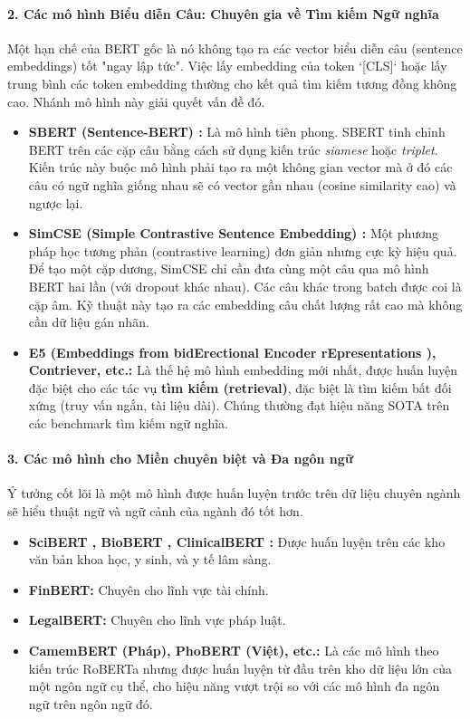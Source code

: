 \paragraph{2. Các mô hình Biểu diễn Câu: Chuyên gia về Tìm kiếm Ngữ nghĩa}
Một hạn chế của BERT gốc là nó không tạo ra các vector biểu diễn câu (sentence embeddings) tốt "ngay lập tức". Việc lấy embedding của token `[CLS]` hoặc lấy trung bình các token embedding thường cho kết quả tìm kiếm tương đồng không cao. Nhánh mô hình này giải quyết vấn đề đó.
\begin{itemize}
    \item \textbf{SBERT (Sentence-BERT) \cite{reimers2019sentence}:} Là mô hình tiên phong. SBERT tinh chỉnh BERT trên các cặp câu bằng cách sử dụng kiến trúc \textit{siamese} hoặc \textit{triplet}. Kiến trúc này buộc mô hình phải tạo ra một không gian vector mà ở đó các câu có ngữ nghĩa giống nhau sẽ có vector gần nhau (cosine similarity cao) và ngược lại.
    \item \textbf{SimCSE (Simple Contrastive Sentence Embedding) \cite{gao2021simcse}:} Một phương pháp học tương phản (contrastive learning) đơn giản nhưng cực kỳ hiệu quả. Để tạo một cặp dương, SimCSE chỉ cần đưa cùng một câu qua mô hình BERT hai lần (với dropout khác nhau). Các câu khác trong batch được coi là cặp âm. Kỹ thuật này tạo ra các embedding câu chất lượng rất cao mà không cần dữ liệu gán nhãn.
    \item \textbf{E5 (Embeddings from bidErectional Encoder rEpresentations \cite{wang2022text}), Contriever, etc.:} Là thế hệ mô hình embedding mới nhất, được huấn luyện đặc biệt cho các tác vụ \textbf{tìm kiếm (retrieval)}, đặc biệt là tìm kiếm bất đối xứng (truy vấn ngắn, tài liệu dài). Chúng thường đạt hiệu năng SOTA trên các benchmark tìm kiếm ngữ nghĩa.
\end{itemize}

\paragraph{3. Các mô hình cho Miền chuyên biệt và Đa ngôn ngữ}
Ý tưởng cốt lõi là một mô hình được huấn luyện trước trên dữ liệu chuyên ngành sẽ hiểu thuật ngữ và ngữ cảnh của ngành đó tốt hơn.
\begin{itemize}
    \item \textbf{SciBERT \cite{beltagy2019scibert}, BioBERT \cite{lee2020biobert}, ClinicalBERT \cite{alsentzer2019publicly}:} Được huấn luyện trên các kho văn bản khoa học, y sinh, và y tế lâm sàng.
    \item \textbf{FinBERT:} Chuyên cho lĩnh vực tài chính.
    \item \textbf{LegalBERT:} Chuyên cho lĩnh vực pháp luật.
    \item \textbf{CamemBERT \cite{martin2019camembert} (Pháp), PhoBERT \cite{nguyen2020phobert} (Việt), etc.:} Là các mô hình theo kiến trúc RoBERTa nhưng được huấn luyện từ đầu trên kho dữ liệu lớn của một ngôn ngữ cụ thể, cho hiệu năng vượt trội so với các mô hình đa ngôn ngữ trên ngôn ngữ đó.
\end{itemize}

